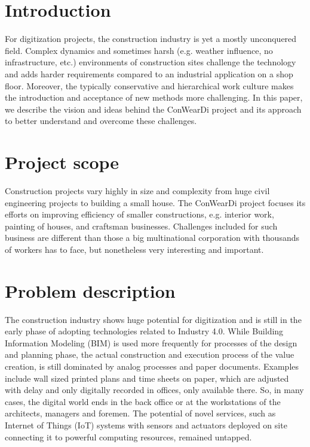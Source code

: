 \section{Introduction}
For digitization projects, the construction industry is yet a mostly unconquered field.
Complex dynamics and sometimes harsh (e.g. weather influence, no infrastructure, etc.) environments of construction sites challenge the technology and adds harder requirements compared to an industrial application on a shop floor. 
Moreover, the typically conservative and hierarchical work culture makes the introduction and acceptance of new methods more challenging. In this paper, we describe the vision and ideas behind the ConWearDi project and its approach to better understand and overcome these challenges.

\section{Project scope}
Construction projects vary highly in size and complexity from huge civil engineering projects to building a small house. 
The ConWearDi project focuses its efforts on improving efficiency of smaller constructions, e.g. interior work, painting of houses, and craftsman businesses.
Challenges included for such business are different than those a big multinational corporation with thousands of workers has to face, but nonetheless very interesting and important.

\section{Problem description}
The construction industry shows huge potential for digitization and is still in the early phase of adopting technologies related to Industry 4.0. 
While Building Information Modeling (BIM) is used more frequently for processes of the design and planning phase, the actual construction and execution process of the value creation, is still dominated by analog processes and paper documents. 
Examples include wall sized printed plans and time sheets on paper, which are adjusted with delay and only digitally recorded in offices, only available there. 
So, in many cases, the digital world ends in the back office or at the workstations of the architects, managers and foremen. 
The potential of novel services, such as Internet of Things (IoT) systems with sensors and actuators deployed on site connecting it to powerful computing resources, remained untapped.

